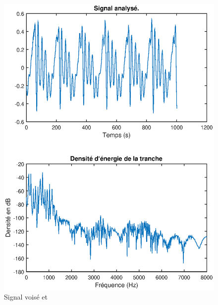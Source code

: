 \documentclass[french]{article}
\begin{document}
\begin{figure}[h!]
	\centering
	\begin{minipage}{0.45\textwidth}
	\centering
	\includegraphics[width=\textwidth]{images/tfd_voise.eps}
	\caption{Signal voisé et }
	\label{fig:dse_vois}
	\end{minipage}
	\begin{minipage}{0.45\textwidth}
	\centering

\end{minipage}
\end{figure}
\end{document}
